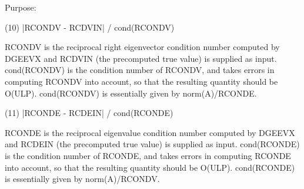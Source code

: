 \begin{DoxyParagraph}{Purpose\+: }
\begin{DoxyVerb}
   (10)  |RCONDV - RCDVIN| / cond(RCONDV)

      RCONDV is the reciprocal right eigenvector condition number
      computed by DGEEVX and RCDVIN (the precomputed true value)
      is supplied as input. cond(RCONDV) is the condition number of
      RCONDV, and takes errors in computing RCONDV into account, so
      that the resulting quantity should be O(ULP). cond(RCONDV) is
      essentially given by norm(A)/RCONDE.

   (11)  |RCONDE - RCDEIN| / cond(RCONDE)

      RCONDE is the reciprocal eigenvalue condition number
      computed by DGEEVX and RCDEIN (the precomputed true value)
      is supplied as input.  cond(RCONDE) is the condition number
      of RCONDE, and takes errors in computing RCONDE into account,
      so that the resulting quantity should be O(ULP). cond(RCONDE)
      is essentially given by norm(A)/RCONDV.\end{DoxyVerb}
 
\end{DoxyParagraph}

